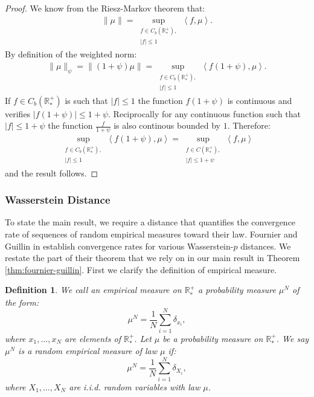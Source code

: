 \documentclass[11pt,a4paper]{article}
\newcommand{\RRP}{\mathbb{R}^+_*}
\newcommand{\brac}[1]{\left\langle#1\right\rangle}
\newtheorem{definition}[theorem]{Definition}
\begin{document}
\begin{proof}
    We know from the Riesz-Markov theorem that:
    \begin{align*}
        \|\mu\| = \sup\limits_{\substack{f \in C_b(\RRP), \\|f| \leq 1}}\brac{f,\mu}.
    \end{align*}
    By definition of the weighted norm:
    \begin{align*}
        \|\mu\|_{\psi} = \|(1 + \psi)\mu\| = \sup\limits_{\substack{f \in C_b(\RRP), \\ |f| \leq 1}}\brac{f(1 + \psi),\mu}.
    \end{align*}
    If $f \in C_b(\RRP)$ is such that $|f| \leq 1$ the function $f(1 + \psi)$ is continuous and verifies $|f(1 + \psi)| \leq 1 + \psi$. Reciprocally for any continuous function such that $|f| \leq 1 + \psi$ the function $\frac{f}{1 + \psi}$ is also continous bounded by $1$. Therefore:
    \begin{align*}
        \sup\limits_{\substack{f \in C_b(\RRP), \\|f| \leq 1}}\brac{f(1 + \psi),\mu} = \sup\limits_{\substack{f \in C(\RRP), \\ |f| \leq 1 + \psi}}\brac{f,\mu}
    \end{align*}
    and the result follows.
\end{proof}


\subsubsection*{Wasserstein Distance}
To state the main result, we require a distance that quantifies the convergence rate of sequences of random empirical measures toward their law. Fournier and Guillin in \cite{fournier2015rate} establish convergence rates for various Wasserstein-$p$ distances. We restate the part of their theorem that we rely on in our main result in Theorem \ref{thm:fournier-guillin}. First we clarify the definition of empirical measure.
\begin{definition}
We call an \emph{empirical measure} on $\RRP$ a probability measure $\mu^N$ of the form:
\[
\mu^N = \dfrac{1}{N} \sum_{i = 1}^N \delta_{x_i},
\]
where $x_1, \dots, x_N$ are elements of $\RRP$. Let $\mu$ be a probability measure on $\RRP$. We say $\mu^N$ is a random empirical measure of \emph{law $\mu$} if:
\[
\mu^N = \dfrac{1}{N} \sum_{i = 1}^N \delta_{X_i},
\]
where $X_1, \dots, X_N$ are i.i.d. random variables with law $\mu$.
\end{definition}
\end{document}
